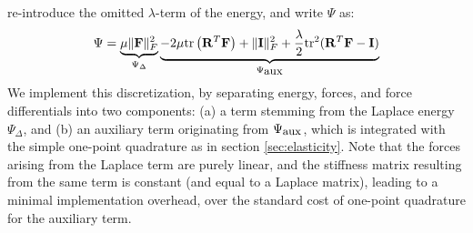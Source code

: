 re-introduce the omitted $\lambda$-term of the energy, and write $\Psi$ as:
\begin{equation}
\Psi=\underbrace{\mu\|\mathbf{F}\|_F^2}_{\Psi_\Delta}
\underbrace{-2\mu\mbox{tr}\left(\mathbf{R}^T\mathbf{F}\right)+\|\mathbf{I}\|_F^2+\frac{\lambda}{2}\mbox{tr}^2(\mathbf{R}^T\mathbf{F}-\mathbf{I})}_{\Psi_{\mbox{\small aux}}}
\label{eqn_psi_poisson_and_aux}
\end{equation}
We implement this discretization, by separating energy, forces, and force differentials into two components: (a) a term stemming from the Laplace energy $\Psi_\Delta$, and (b) an
auxiliary term originating from $\Psi_{\mbox{\small aux}}$, which is integrated with the simple one-point quadrature as in section \ref{sec:elasticity}. Note that the forces arising from
the Laplace term are purely linear, and the stiffness matrix resulting from the same term is constant (and equal to a Laplace matrix), leading to a minimal implementation overhead, over
the standard cost of one-point quadrature for the auxiliary term. 


